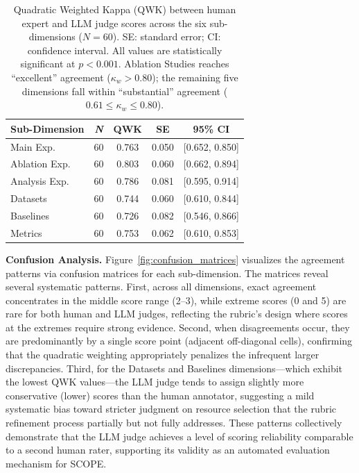 \begin{table}[htbp]
\centering
\small
\setlength{\tabcolsep}{1.5mm}
\renewcommand{\arraystretch}{1.15}
\begin{tabular}{@{}lcccc@{}}
\toprule
\textbf{Sub-Dimension} & \textbf{\textit{N}} & \textbf{QWK} & \textbf{SE} & \textbf{95\% CI} \\
\midrule
Main Exp.      & 60 & 0.763 & 0.050 & [0.652, 0.850] \\
Ablation Exp.     & 60 & 0.803 & 0.060 & [0.662, 0.894] \\
Analysis Exp. & 60 & 0.786 & 0.081 & [0.595, 0.914] \\
Datasets             & 60 & 0.744 & 0.060 & [0.610, 0.844] \\
Baselines            & 60 & 0.726 & 0.082 & [0.546, 0.866] \\
Metrics              & 60 & 0.753 & 0.062 & [0.610, 0.853] \\
\bottomrule
\end{tabular}
\caption{Quadratic Weighted Kappa (QWK) between human expert and LLM judge scores across the six sub-dimensions ($N = 60$). SE: standard error; CI: confidence interval. All values are statistically significant at $p < 0.001$. Ablation Studies reaches ``excellent'' agreement ($\kappa_w > 0.80$); the remaining five dimensions fall within ``substantial'' agreement ($0.61 \leq \kappa_w \leq 0.80$).}
\label{tab:qwk}
\end{table}

\textbf{Confusion Analysis.} Figure~\ref{fig:confusion_matrices} visualizes the agreement patterns via confusion matrices for each sub-dimension. The matrices reveal several systematic patterns. First, across all dimensions, exact agreement concentrates in the middle score range (2--3), while extreme scores (0 and 5) are rare for both human and LLM judges, reflecting the rubric's design where scores at the extremes require strong evidence. Second, when disagreements occur, they are predominantly by a single score point (adjacent off-diagonal cells), confirming that the quadratic weighting appropriately penalizes the infrequent larger discrepancies. Third, for the Datasets and Baselines dimensions---which exhibit the lowest QWK values---the LLM judge tends to assign slightly more conservative (lower) scores than the human annotator, suggesting a mild systematic bias toward stricter judgment on resource selection that the rubric refinement process partially but not fully addresses. These patterns collectively demonstrate that the LLM judge achieves a level of scoring reliability comparable to a second human rater, supporting its validity as an automated evaluation mechanism for \textsc{SCOPE}.



